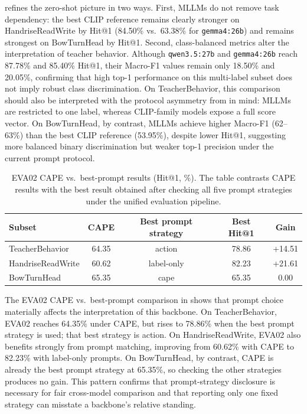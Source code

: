 \documentclass[symmetry,article,submit,pdftex,moreauthors]{Definitions/mdpi}
\begin{document}
 refines the zero-shot picture in two ways. First, MLLMs do not remove task dependency: the best CLIP reference remains clearly stronger on HandriseReadWrite by Hit@1 (84.50\% vs.\ 63.38\% for \texttt{gemma4:26b}) and remains strongest on BowTurnHead by Hit@1. Second, class-balanced metrics alter the interpretation of teacher behavior. Although \texttt{qwen3.5:27b} and \texttt{gemma4:26b} reach 87.78\% and 85.40\% Hit@1, their Macro-F1 values remain only 18.50\% and 20.05\%, confirming that high top-1 performance on this multi-label subset does not imply robust class discrimination. On TeacherBehavior, this comparison should also be interpreted with the protocol asymmetry from  in mind: MLLMs are restricted to one label, whereas CLIP-family models expose a full score vector. On BowTurnHead, by contrast, MLLMs achieve higher Macro-F1 (62--63\%) than the best CLIP reference (53.95\%), despite lower Hit@1, suggesting more balanced binary discrimination but weaker top-1 precision under the current prompt protocol.

\begin{table}[H]
\caption{EVA02 CAPE vs.\ best-prompt results (Hit@1, \%). The table contrasts CAPE results with the best result obtained after checking all five prompt strategies under the unified evaluation pipeline.}
\label{tab:eva02_prompt_check}
\centering
\small
\begin{tabular}{l c c c c}
\toprule
\textbf{Subset} & \textbf{CAPE} & \textbf{Best prompt strategy} & \textbf{Best Hit@1} & \textbf{Gain} \\
\midrule
TeacherBehavior & 64.35 & action & 78.86 & +14.51 \\
HandriseReadWrite & 60.62 & label-only & 82.23 & +21.61 \\
BowTurnHead & 65.35 & cape & 65.35 & 0.00 \\
\bottomrule
\end{tabular}
\end{table}

The EVA02 CAPE vs.\ best-prompt comparison in  shows that prompt choice materially affects the interpretation of this backbone. On TeacherBehavior, EVA02 reaches 64.35\% under CAPE, but rises to 78.86\% when the best prompt strategy is used; that best strategy is action. On HandriseReadWrite, EVA02 also benefits strongly from prompt matching, improving from 60.62\% with CAPE to 82.23\% with label-only prompts. On BowTurnHead, by contrast, CAPE is already the best prompt strategy at 65.35\%, so checking the other strategies produces no gain. This pattern confirms that prompt-strategy disclosure is necessary for fair cross-model comparison and that reporting only one fixed strategy can misstate a backbone's relative standing.
\end{document}
